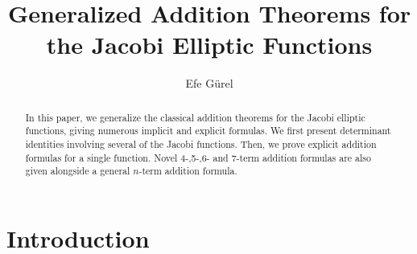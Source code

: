 \documentclass{amsart}
\author{Efe Gürel}
\title[Addition Theorems for Jacobi Functions]{Generalized Addition Theorems for the Jacobi Elliptic Functions}
\theoremstyle{definition}
\begin{document}
\begin{abstract}
    In this paper, we generalize the classical addition theorems for the Jacobi elliptic functions, giving numerous implicit and explicit formulas. We first present determinant identities involving several of the Jacobi functions. Then, we prove explicit addition formulas for a single function. Novel 4-,5-,6- and 7-term addition formulas are also given alongside a general $n$-term addition formula. 
\end{abstract}
\maketitle
\section{Introduction}
\end{document}
